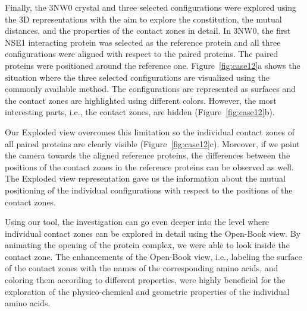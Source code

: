 \documentclass{bmcart}
\def\OpBook {Open-Book view\xspace}
\def\ExpView {Exploded view\xspace}
\begin{document}
Finally, the 3NW0 crystal and three selected configurations were explored using the 3D representations with the aim to explore the constitution, the mutual distances, and the properties of the contact zones in detail.
In 3NW0, the first NSE1 interacting protein was selected as the reference protein and all three configurations were aligned with respect to the paired proteins.
The paired proteins were positioned around the reference one.
Figure~\ref{fig:case12}a shows the situation where the three selected configurations are visualized using the commonly available method.
The configurations are represented as surfaces and the contact zones are highlighted using different colors.
However, the most interesting parts, i.e., the contact zones, are hidden (Figure~\ref{fig:case12}b).

Our \ExpView overcomes this limitation so the individual contact zones of all paired proteins are clearly visible (Figure~\ref{fig:case12}c).
Moreover, if we point the camera towards the aligned reference proteins, the differences between the positions of the contact zones in the reference proteins can be observed as well.
The \ExpView representation gave us the information about the mutual positioning of the individual configurations with respect to the positions of the contact zones.

Using our tool, the investigation can go even deeper into the level where individual contact zones can be explored in detail using the \OpBook.
By animating the opening of the protein complex, we were able to look inside the contact zone.
The enhancements of the \OpBook, i.e., labeling the surface of the contact zones with the names of the corresponding amino acids, and coloring them according to different properties, were highly beneficial for the exploration of the physico-chemical and geometric properties of the individual amino acids.%



\end{document}
